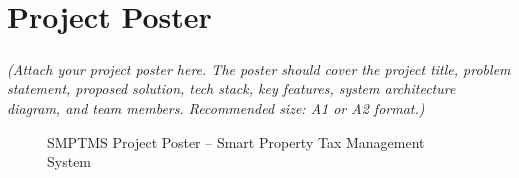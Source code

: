 \chapter*{Project Poster}
\paragraph{}\textit{(Attach your project poster here. The poster should cover the project title, problem statement, proposed solution, tech stack, key features, system architecture diagram, and team members. Recommended size: A1 or A2 format.)}

\begin{figure}[H]
  \centering
  \fbox{\rule{0pt}{16cm}\rule{12cm}{0pt}}
  \caption{SMPTMS Project Poster -- Smart Property Tax Management System}
\end{figure}
